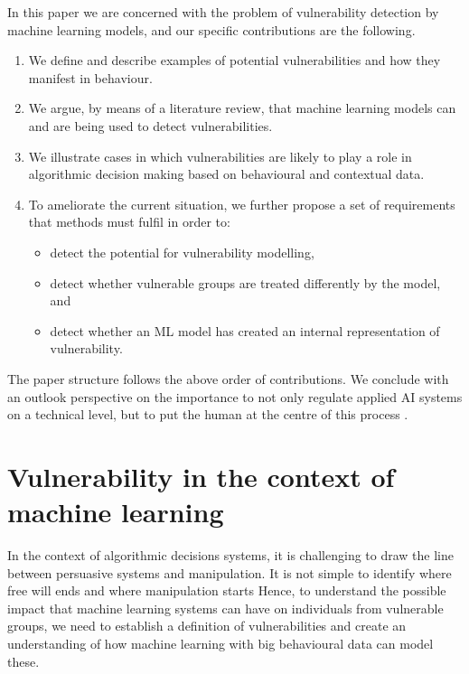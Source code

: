 \documentclass[11pt,theapa]{article}
\theoremstyle{plain}
\begin{document}
In this paper we are concerned with the problem of vulnerability detection by machine learning models, and our specific contributions are the following.
\begin{enumerate}
\item We define and describe examples of potential vulnerabilities and how they manifest in behaviour. 
\item We  argue, by means of a literature review, that machine learning models can and are being used to detect vulnerabilities.  
\item We illustrate cases in which vulnerabilities are likely to play a role in algorithmic decision making based on behavioural and contextual data. 
\item To ameliorate the current situation, we further propose a set of requirements that methods must fulfil in order to:
\begin{itemize}
\item detect the potential for vulnerability modelling, 
\item detect whether vulnerable groups are treated differently by the model, and 
\item detect whether an ML model has created an internal representation of vulnerability. 
\end{itemize}
\end{enumerate}
The paper structure follows the above order of contributions. We conclude with an outlook perspective on the importance to not only regulate applied AI systems on a technical level, but to put the human at the centre of this process \cite{Shneiderman2020}.

\section{Vulnerability in the context of machine learning}\label{sec:state}
In the context of algorithmic decisions systems, it is challenging to draw the line between persuasive  systems and manipulation. It is not simple to identify where free will ends and where manipulation starts  \cite{Mathur2021,Klenk2020} Hence, to understand the possible impact that machine learning systems can have on individuals from vulnerable groups, we need to establish a definition of vulnerabilities and create an understanding of how machine learning with big behavioural data can model these. 
\end{document}

